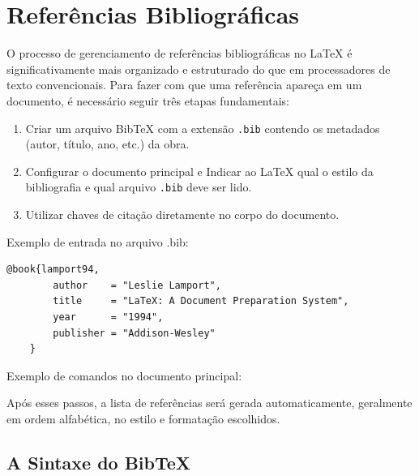 \documentclass{article}
\begin{document}
\begin{teX}
	\usepackage{parskip} %
\end{teX}

\section{Referências Bibliográficas}

O processo de gerenciamento de referências bibliográficas no \LaTeX\hspace{1pt} é significativamente mais organizado e estruturado do que em processadores de texto convencionais. Para fazer com que uma referência apareça em um documento, é necessário seguir três etapas fundamentais:

\begin{enumerate}
	\item Criar um arquivo BibTeX com a extensão \texttt{.bib} contendo os metadados (autor, título, ano, etc.) da obra.
	\item Configurar o documento principal e Indicar ao \LaTeX\hspace{1pt} qual o estilo da bibliografia e qual arquivo \texttt{.bib} deve ser lido.
	\item Utilizar chaves de citação diretamente no corpo do documento.
\end{enumerate}

Exemplo de entrada no arquivo .bib:
\begin{lstlisting}[style=bibtex]
	@book{lamport94,
		author    = "Leslie Lamport",
		title     = "LaTeX: A Document Preparation System",
		year      = "1994",
		publisher = "Addison-Wesley"
	}
\end{lstlisting}

Exemplo de comandos no documento principal:
\begin{teX}
	
\end{teX}

Após esses passos, a lista de referências será gerada automaticamente, geralmente em ordem alfabética, no estilo e formatação escolhidos.

\subsection{A Sintaxe do BibTeX}
\end{document}
